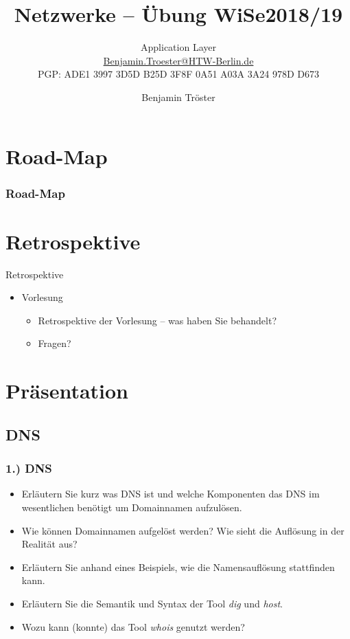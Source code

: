 \documentclass[xcolor=dvipsnames, aspectratio=169]{beamer}
\begin{document}

\title{Netzwerke -- Übung WiSe2018/19}
\subtitle{Application Layer\\
		\href{mailto:Benjamin.Troester@HTW-Berlin.de}{Benjamin.Troester@HTW-Berlin.de}\\
		PGP: ADE1 3997 3D5D B25D 3F8F 0A51 A03A 3A24 978D D673 }
\author{Benjamin Tröster}

\date{}

\begin{frame}
\titlepage

\end{frame}

\section*{Road-Map}
\begin{frame}
\frametitle{Road-Map}
\begin{multicols}{2}
  \tableofcontents
\end{multicols}
\end{frame}

\section{Retrospektive}
\begin{frame}{Retrospektive}
\begin{itemize}[<+->]
	\item Vorlesung
	\begin{itemize}
		\item Retrospektive der Vorlesung -- was haben Sie behandelt?
		\item Fragen?
	\end{itemize}
\end{itemize}
\end{frame}


\section{Präsentation}
\subsection{DNS}
\begin{frame}
	\frametitle{1.) DNS}
	\begin{itemize}
		\item Erläutern Sie kurz was DNS ist und welche Komponenten das DNS im wesentlichen benötigt um Domainnamen aufzulösen.
		\item Wie können Domainnamen aufgelöst werden? Wie sieht die Auflösung in der Realität aus?
		\item Erläutern Sie anhand eines Beispiels, wie die Namensauflösung stattfinden kann.
		\item Erläutern Sie die Semantik und Syntax der Tool \emph{dig} und \emph{host}. 
		\item Wozu kann (konnte) das Tool \emph{whois} genutzt werden?
	\end{itemize}
\end{frame}
\end{document}
